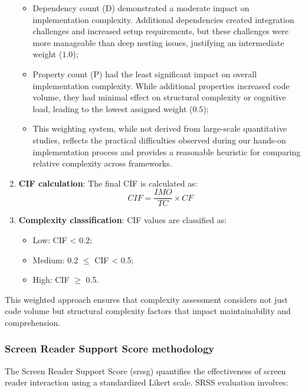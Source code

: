 \begin{enumerate}
    \begin{itemize}
        \item Dependency count (D) demonstrated a moderate impact on implementation complexity. Additional dependencies created integration challenges and increased setup requirements, but these challenges were more manageable than deep nesting issues, justifying an intermediate weight ($1.0$);

        \item Property count (P) had the least significant impact on overall implementation complexity. While additional properties increased code volume, they had minimal effect on structural complexity or cognitive load, leading to the lowest assigned weight ($0.5$);

        \item This weighting system, while not derived from large-scale quantitative studies, reflects the practical difficulties observed during our hands-on implementation process and provides a reasonable heuristic for comparing relative complexity across frameworks.
    \end{itemize}

    \item \textbf{CIF calculation}: The final CIF is calculated as:
    \begin{equation}
    CIF = \frac{IMO}{TC} \times CF
    \end{equation}
    
    \item \textbf{Complexity classification}: CIF values are classified as:
    \begin{itemize}
        \item Low: CIF < 0.2;
        \item Medium: 0.2 $\leq$ CIF < 0.5;
        \item High: CIF $\geq$ 0.5.
    \end{itemize}
\end{enumerate}

This weighted approach ensures that complexity assessment considers not just code volume but structural complexity factors that impact maintainability and comprehension.

\subsubsection{Screen Reader Support Score methodology}
\label{subsubsec:srss-methodology}

The Screen Reader Support Score (\gls{srssg}) quantifies the effectiveness of screen reader interaction using a standardized Likert scale. SRSS evaluation involves:

